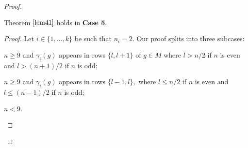 \begin{proof}
\begin{Prop}
\label{case5prop}
Theorem $\ref{lem41}$ holds in {\bf Case 5}.
\end{Prop}
\begin{proof}
 Let $i \in \{1, \ldots, k\}$  be  such that $n_i=2$. Our proof  splits into three subcases:
\begin{description}[before={\renewcommand\makelabel[1]{\bfseries ##1}}]
\item[{\bf Case (5.1)}] $n\ge 9$ and $\gamma_i(g)$ appears in rows  $\{l,l+1\}$ of $g \in M$ where $l>n/2$ if $n$ is even and $l>(n+1)/2$ if $n$ is odd;
\item[{\bf Case (5.2)}] $n \ge 9$ and $\gamma_i(g)$ appears in rows $\{l-1,l\},$ where $l \le n/2$ if $n$ is even and $l \le (n-1)/2$ if $n$ is odd;
\item[{\bf Case (5.3)}] $n<9$.
\end{description} 


\end{proof}
\end{proof}
